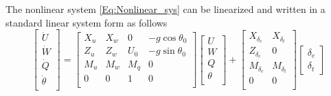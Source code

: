 \documentclass{article}
\begin{document}
The nonlinear system \ref{Eq:Nonlinear_sys} can be linearized and
written in a standard linear system form as follows \cite{Nelson, Stevens-Lewis}
\begin{equation} \label{Eq:Linearized_sys}
    \begin{bmatrix}
    \dot{U} \\
    \dot{W} \\
    \dot{Q} \\
    \dot{\theta} \\ 	
    \end{bmatrix}
    =
    \begin{bmatrix}
    X_u & X_w & 0 & -g \cos{\theta_0}\\
    Z_u & Z_w & U_0 & -g \sin{\theta_0}\\
    M_u & M_w & M_q & 0\\
    0 & 0 & 1 & 0 \\
    \end{bmatrix}
    \begin{bmatrix}
    U \\
    W \\
    Q \\
    \theta \\ 	
    \end{bmatrix}
    +
    \begin{bmatrix}
    X_{\delta_e} & X_{\delta_t} \\
    Z_{\delta_e} & 0 \\
    M_{\delta_e} & M_{\delta_t} \\
    0 & 0\\ 	
    \end{bmatrix}
    \begin{bmatrix}
    {\delta_e} \\
    {\delta_t}  	
    \end{bmatrix}
\end{equation}
\end{document}
